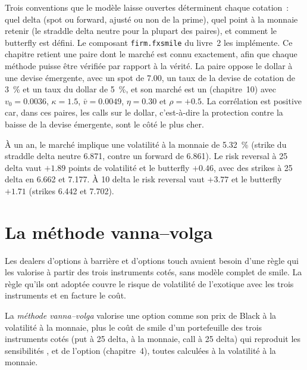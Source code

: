 Trois conventions que le modèle laisse ouvertes déterminent chaque cotation~: quel delta (spot ou forward, ajusté ou non de la prime),
quel point à la monnaie retenir (le straddle delta neutre pour la plupart des paires), et comment le butterfly est défini. Le composant
\texttt{firm.fxsmile} du livre~2 les implémente. Ce chapitre retient une paire dont le marché est connu exactement, afin que chaque méthode puisse être
vérifiée par rapport à la vérité. La paire oppose le dollar à une devise émergente, avec un spot de 7.00, un taux de la devise de cotation de 3~\% et un taux du dollar
de 5~\%, et son marché est un  (chapitre~10) avec $v_0=0.0036$, $\kappa=1.5$, $\bar v=0.0049$, $\eta=0.30$ et $\rho=+0.5$. La
corrélation est positive car, dans ces paires, les calls sur le dollar, c'est-à-dire la protection contre la baisse de la devise émergente, sont le
côté le plus cher.

\begin{example}\label{ex:dv:fx-derivatives:quotes}
À un an, le marché implique une volatilité à la monnaie de 5.32~\% (strike du straddle delta neutre 6.871, contre un forward de 6.861). Le
risk reversal à 25 delta vaut $+1.89$ points de volatilité et le butterfly $+0.46$, avec des strikes à 25 delta en 6.662 et 7.177. À 10 delta
le risk reversal vaut $+3.77$ et le butterfly $+1.71$ (strikes 6.442 et 7.702).
\end{example}

\section{La méthode vanna--volga}

Les dealers d'options à barrière et d'options touch avaient besoin d'une règle qui les valorise à partir des trois instruments cotés, sans
modèle complet de smile. La règle qu'ils ont adoptée couvre le risque de volatilité de l'exotique avec les
trois instruments et en facture le coût.

\begin{definition}\label{def:dv:fx-derivatives:vv}
La \emph{méthode vanna--volga} valorise une option comme son prix de Black à la volatilité à la monnaie, plus
le coût de smile d'un portefeuille des trois instruments cotés (put à 25 delta, à la monnaie, call à 25 delta) qui reproduit
les sensibilités ,  et  de l'option (chapitre~4), toutes calculées à la volatilité à la monnaie.
\end{definition}

